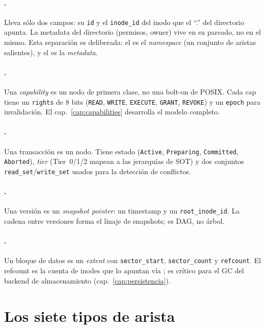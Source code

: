 \paragraph{\NDir.} Lleva sólo dos campos: su \texttt{id} y el
\texttt{inode\_id} del inodo que el ``.'' del directorio apunta. La
metadata del directorio (permisos, owner) vive en su \NInode{} pareado, no
en el \NDir{} mismo. Esta separación es deliberada: el \NDir{} es el
\emph{namespace} (un conjunto de aristas \econtains{} salientes), y el
\NInode{} es la \emph{metadata}.

\paragraph{\NCap.} Una \emph{capability} es un nodo de primera clase, no
una bolt-on de POSIX. Cada cap tiene un \texttt{rights} de 8 bits
(\texttt{READ}, \texttt{WRITE}, \texttt{EXECUTE}, \texttt{GRANT},
\texttt{REVOKE}) y un \texttt{epoch} para invalidación. El cap.~\ref{cap:capabilities}
desarrolla el modelo completo.

\paragraph{\NTxn.} Una transacción es un nodo. Tiene estado
(\texttt{Active}, \texttt{Preparing}, \texttt{Committed}, \texttt{Aborted}),
\emph{tier} (Tier~0/1/2 mapean a las jerarquías de SOT) y dos conjuntos
\texttt{read\_set}/\texttt{write\_set} usados para la detección de
conflictos.

\paragraph{\NVer.} Una versión es un \emph{snapshot pointer}: un timestamp
y un \texttt{root\_inode\_id}. La cadena \ederivedfrom{} entre versiones
forma el linaje de snapshots; es DAG, no árbol.

\paragraph{\NBlk.} Un bloque de datos es un \emph{extent} con
\texttt{sector\_start}, \texttt{sector\_count} y \texttt{refcount}. El
refcount es la cuenta de inodes que lo apuntan vía \epointsto; es
crítico para el GC del backend de almacenamiento
(cap.~\ref{cap:persistencia}).

\section{Los siete tipos de arista}
\label{sec:aristas}

